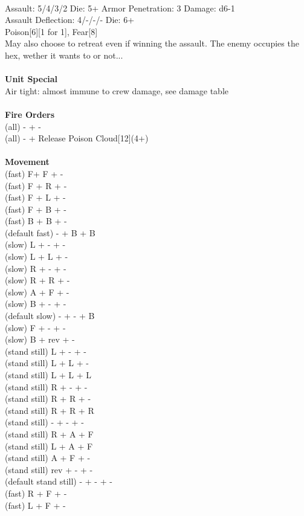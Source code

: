 \ \\
Assault: 5/4/3/2 Die: 5+ Armor Penetration: 3 Damage: d6-1 \\
Assault Deflection: 4/-/-/- Die: 6+\\
\indent Poison[6][1 for 1], Fear[8] \\ May also choose to retreat even if winning the assault. The enemy occupies the hex, wether it wants to or not... \\
\ \\

{\bf Unit Special} \\
Air tight: almost immune to crew damage, see damage table
\ \\


\ \\ {\bf Fire Orders } \\
(all) - + -  \\
(all) - + Release Poison Cloud[12](4+) \\
\ \\ {\bf Movement } \\
(fast) F+ F + - \\
(fast) F + R + - \\
(fast) F + L + - \\
(fast) F + B + - \\
(fast) B + B + - \\
(default fast) - + B + B \\
(slow) L + - + - \\
(slow) L + L + - \\
(slow) R + - + - \\
(slow) R + R + - \\
(slow) A + F + - \\
(slow) B + - + - \\
(default slow) - + - + B \\
(slow) F + - + - \\
(slow) B + rev + - \\
(stand still) L + - + - \\
(stand still) L + L + - \\
(stand still) L + L + L \\
(stand still) R + - + - \\
(stand still) R + R + - \\
(stand still) R + R + R \\
(stand still) - + - + - \\
(stand still) R + A + F \\
(stand still) L + A + F \\
(stand still) A + F + - \\
(stand still) rev + - + - \\
(default stand still) - + - + - \\
(fast) R + F + - \\
(fast) L + F + - \\



